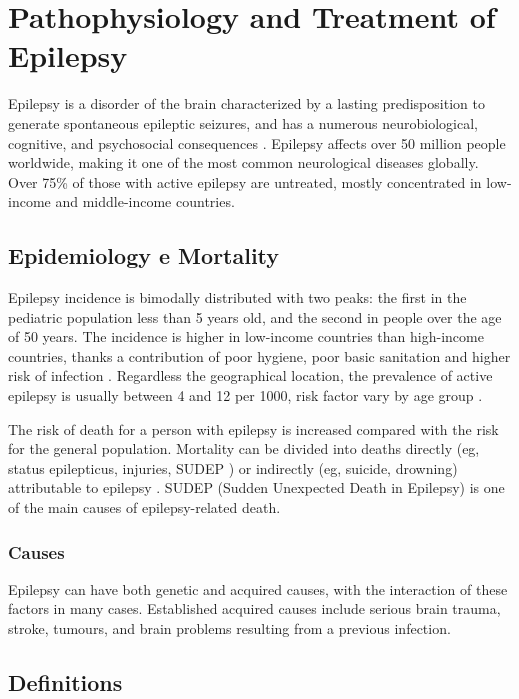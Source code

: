 \section[Overview of Epilepsy disease]{Pathophysiology and Treatment of Epilepsy}
Epilepsy is a disorder of the brain characterized by a lasting predisposition to generate spontaneous epileptic seizures, and has a numerous neurobiological, cognitive, and psychosocial consequences \cite{defEpilepsy}.
Epilepsy affects over 50 million people worldwide, making it one of the most common neurological diseases globally. Over 75\% of those with active epilepsy are untreated, mostly concentrated in low-income and middle-income countries. \cite{defeating_epilepsy}
  \subsection*{Epidemiology e Mortality}
  Epilepsy incidence is bimodally distributed with two peaks: the first in the pediatric population less than 5 years old, and the second in people over the age of 50 years. The incidence is higher in low-income countries than high-income countries, thanks a contribution of poor hygiene, poor basic sanitation and higher risk of infection \cite{THIJS2019689}.
  Regardless the geographical location, the prevalence of active epilepsy is usually between 4 and 12 per 1000, risk factor vary by age group \cite{Fiest296}.

  The risk of death for a person with epilepsy is increased compared with the risk for the general population. Mortality can be divided into deaths directly (eg, status epilepticus, injuries, SUDEP \cite{Langan211}) or indirectly (eg, suicide, drowning) attributable to epilepsy \cite{Devinsky779}. SUDEP (Sudden Unexpected Death in Epilepsy) is one of the main causes of epilepsy-related death.
  \subsubsection*{Causes}
  Epilepsy can have both genetic and acquired causes, with the interaction of these factors in many cases. Established acquired causes include serious brain trauma, stroke, tumours, and brain problems resulting from a previous infection.

  \subsection*{Definitions}
